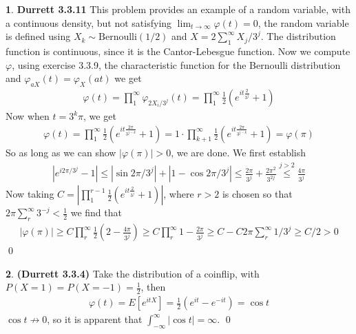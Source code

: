 \documentclass{article}
\theoremstyle{definition}
\newtheorem{pb}{}
\newcommand{\abs}[1]{\left\vert#1\right\vert}
\begin{document}
    \begin{pb}\textbf{Durrett 3.3.11}
        This problem provides an example of a random variable, with a continuous density, but not satisfying \(\lim_{t\to\infty}\varphi(t) = 0\), the random variable is defined using \(X_k \sim \text{Bernoulli}(1/2)\) and \(X = 2\sum_1^\infty X_j/3^j\). The distribution function is continuous, since it is the Cantor-Lebesgue function. Now we compute \(\varphi\), using exercise 3.3.9, the characteristic function for the Bernoulli distribution and \(\varphi_{aX}(t)=\varphi_X(at)\) we get
        \begin{align*}
            \varphi(t) = \prod_1^\infty \varphi_{2X_i/3^j}(t) = \prod_1^\infty \frac12\left(e^{it\frac{2}{3^j}} + 1\right)
        \end{align*}
        Now when \(t = 3^k\pi\), we get
        \begin{align*}
            \varphi(t) = \prod_1^\infty \frac{1}{2}\left(e^{it\frac{2\pi}{3^{j-k}}} + 1\right) = 1\cdot\prod_{k+1}^\infty \frac{1}{2}\left(e^{it\frac{2\pi}{3^{j-k}}} + 1\right) = \varphi(\pi)
        \end{align*}
        So as long as we can show \(\abs{\varphi(\pi)} > 0\), we are done. We first establish
        \begin{align*}
            \abs{e^{i2\pi/3^j} - 1} \leq \abs{\sin2\pi/3^j} + \abs{1 - \cos2\pi/3^j} \leq \frac{2\pi}{3^j} + \frac{2\pi^2}{3^{2j}} \overset{j>2}{\leq} \frac{4\pi}{3^j}
        \end{align*}
        Now taking \(C = \abs{\prod_1^{r-1} \frac12\left(e^{it\frac{2}{3^j}} + 1\right)}\), where \(r > 2\) is chosen so that \(2\pi\sum_r^\infty3^{-j} < \frac12\) we find that
        \begin{align*}
            \abs{\varphi(\pi)} \geq C\prod_r^\infty \frac12\left(2-\frac{4\pi}{3^j}\right) \geq C\prod_r^\infty 1 - \frac{2\pi}{3^j} \geq C - C2\pi\sum_r^\infty 1/3^j \geq C/2 > 0
        \end{align*} \qed
    \end{pb}
    \begin{pb}\textbf{(Durrett 3.3.4)}
        Take the distribution of a coinflip, with \(P(X=1)=P(X=-1)=\frac12\), then
        \begin{align*}
            \varphi(t) = E[e^{itX}] = \frac{1}{2}(e^{it} - e^{-it}) = \cos t
        \end{align*}
        \(\cos t \not \to 0\), so it is apparent that \(\int_{-\infty}^\infty \abs{\cos t} = \infty\). \qed
    \end{pb}
\end{document}

